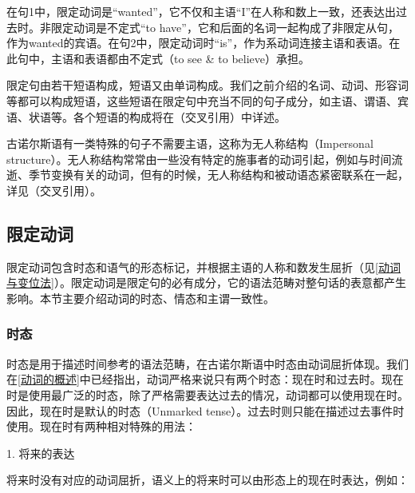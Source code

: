 {{在句1中，限定动词是``wanted''，它不仅和主语``I''在人称和数上一致，还表达出过去时。非限定动词是不定式``to
have''，它和后面的名词一起构成了非限定从句，作为wanted的宾语。在句2中，限定动词时``is''，作为系动词连接主语和表语。在此句中，主语和表语都由不定式（to
see \& to believe）承担。

限定句由若干短语构成，短语又由单词构成。我们之前介绍的名词、动词、形容词等都可以构成短语，这些短语在限定句中充当不同的句子成分，如主语、谓语、宾语、状语等。各个短语的构成将在（交叉引用）中详述。

古诺尔斯语有一类特殊的句子不需要主语，这称为无人称结构（Impersonal
structure）。无人称结构常常由一些没有特定的施事者的动词引起，例如与时间流逝、季节变换有关的动词，但有的时候，无人称结构和被动语态紧密联系在一起，详见（交叉引用）。

\subsection{限定动词}\label{限定动词}

限定动词包含时态和语气的形态标记，并根据主语的人称和数发生屈折（见\ref{动词与变位法}）。限定动词是限定句的必有成分，它的语法范畴对整句话的表意都产生影响。本节主要介绍动词的时态、情态和主谓一致性。

\subsubsection{时态}\label{时态}

时态是用于描述时间参考的语法范畴，在古诺尔斯语中时态由动词屈折体现。我们在\ref{动词的概述}中已经指出，动词严格来说只有两个时态：现在时和过去时。现在时是使用最广泛的时态，除了严格需要表达过去的情况，动词都可以使用现在时。因此，现在时是默认的时态（Unmarked
tense）。过去时则只能在描述过去事件时使用。现在时有两种相对特殊的用法：

1. 将来的表达

将来时没有对应的动词屈折，语义上的将来时可以由形态上的现在时表达，例如：

}}
